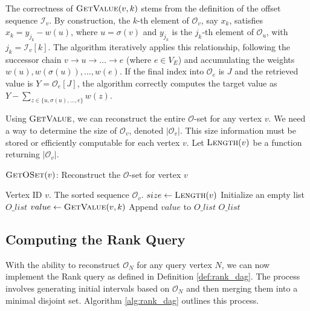 The correctness of $\textsc{GetValue}(v, k)$ stems from the definition of the offset sequence $\mathcal{I}_v$. By construction, the $k$-th element of $\mathcal{O}_v$, say $x_k$, satisfies $x_k = y_{j_k} - w(u)$, where $u = \sigma(v)$ and $y_{j_k}$ is the $j_k$-th element of $\mathcal{O}_u$, with $j_k = \mathcal{I}_v[k]$. The algorithm iteratively applies this relationship, following the successor chain $v \to u \to \dots \to e$ (where $e \in V_E$) and accumulating the weights $w(u), w(\sigma(u)), \dots, w(e)$. If the final index into $\mathcal{O}_e$ is $J$ and the retrieved value is $Y = \mathcal{O}_e[J]$, the algorithm correctly computes the target value as $Y - \sum_{z \in \{u, \sigma(u), \dots, e\}} w(z)$.

Using $\textsc{GetValue}$, we can reconstruct the entire $\mathcal{O}$-set for any vertex $v$. We need a way to determine the size of $\mathcal{O}_v$, denoted $|\mathcal{O}_v|$. This size information must be stored or efficiently computable for each vertex $v$. Let $\textsc{Length}(v)$ be a function returning $|\mathcal{O}_v|$.

\begin{algorithm}
    \caption{$\textsc{GetOSet}(v)$: Reconstruct the $\mathcal{O}$-set for vertex $v$}
    \label{alg:get_o_set}
    \small
    \begin{algorithmic}[1]
        \Require Vertex ID $v$.
        \Ensure The sorted sequence $\mathcal{O}_v$.
        \State $size \gets \textsc{Length}(v)$
        \State Initialize an empty list $O\_list$
        \State $value \gets \textsc{GetValue}(v, k)$
        \State Append $value$ to $O\_list$
        \EndFor
        \State \Return $O\_list$ 
    \end{algorithmic}
\end{algorithm}

\subsection{Computing the Rank Query}
\label{subsec:computing_rank}

With the ability to reconstruct $\mathcal{O}_N$ for any query vertex $N$, we can now implement the Rank query as defined in Definition \ref{def:rank_dag}. The process involves generating initial intervals based on $\mathcal{O}_N$ and then merging them into a minimal disjoint set. Algorithm \ref{alg:rank_dag} outlines this process.

